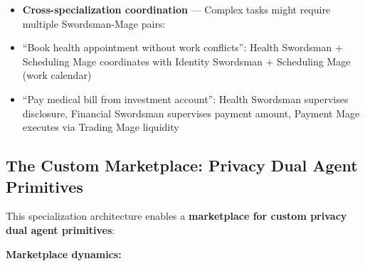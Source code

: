 \documentclass[
  11pt,
]{article}
\begin{document}
\begin{itemize}
  its domain's slice of the private ledger. Each Mage only receives
  authorization from whichever Swordsman is supervising that task. The
  server coordinates but no single agent sees the complete picture.
\item
  \textbf{Cross-specialization coordination} --- Complex tasks might
  require multiple Swordsman-Mage pairs:
\item
  ``Book health appointment without work conflicts'': Health Swordsman +
  Scheduling Mage coordinates with Identity Swordsman + Scheduling Mage
  (work calendar)
\item
  ``Pay medical bill from investment account'': Health Swordsman
  supervises disclosure, Financial Swordsman supervises payment amount,
  Payment Mage executes via Trading Mage liquidity
\end{itemize}

\subsection{The Custom Marketplace: Privacy Dual Agent
Primitives}\label{the-custom-marketplace-privacy-dual-agent-primitives}

This specialization architecture enables a \textbf{marketplace for
custom privacy dual agent primitives}:

\textbf{Marketplace dynamics:}
\end{document}
